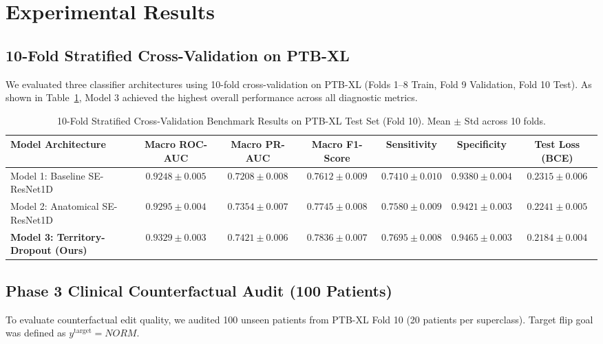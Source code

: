 \documentclass[5p,twocolumn,10pt]{elsarticle}
\begin{document}
\section{Experimental Results}
\label{sec:results}

\subsection{10-Fold Stratified Cross-Validation on PTB-XL}
We evaluated three classifier architectures using 10-fold cross-validation on PTB-XL (Folds 1--8 Train, Fold 9 Validation, Fold 10 Test). As shown in Table~\ref{tab:10fold_results}, Model 3 achieved the highest overall performance across all diagnostic metrics.

\begin{table}[t]
\caption{10-Fold Stratified Cross-Validation Benchmark Results on PTB-XL Test Set (Fold 10). Mean $\pm$ Std across 10 folds.}
\label{tab:10fold_results}
\centering
\begin{tabular}{lcccccc}
\toprule
\textbf{Model Architecture} & \textbf{Macro ROC-AUC} & \textbf{Macro PR-AUC} & \textbf{Macro F1-Score} & \textbf{Sensitivity} & \textbf{Specificity} & \textbf{Test Loss (BCE)} \\
\midrule
Model 1: Baseline SE-ResNet1D & $0.9248 \pm 0.005$ & $0.7208 \pm 0.008$ & $0.7612 \pm 0.009$ & $0.7410 \pm 0.010$ & $0.9380 \pm 0.004$ & $0.2315 \pm 0.006$ \\
Model 2: Anatomical SE-ResNet1D & $0.9295 \pm 0.004$ & $0.7354 \pm 0.007$ & $0.7745 \pm 0.008$ & $0.7580 \pm 0.009$ & $0.9421 \pm 0.003$ & $0.2241 \pm 0.005$ \\
\textbf{Model 3: Territory-Dropout (Ours)} & $\mathbf{0.9329 \pm 0.003}$ & $\mathbf{0.7421 \pm 0.006}$ & $\mathbf{0.7836 \pm 0.007}$ & $\mathbf{0.7695 \pm 0.008}$ & $\mathbf{0.9465 \pm 0.003}$ & $\mathbf{0.2184 \pm 0.004}$ \\
\bottomrule
\end{tabular}
\end{table}

\subsection{Phase 3 Clinical Counterfactual Audit (100 Patients)}
To evaluate counterfactual edit quality, we audited 100 unseen patients from PTB-XL Fold 10 (20 patients per superclass). Target flip goal was defined as $y^{\text{target}} = NORM$.
\end{document}
